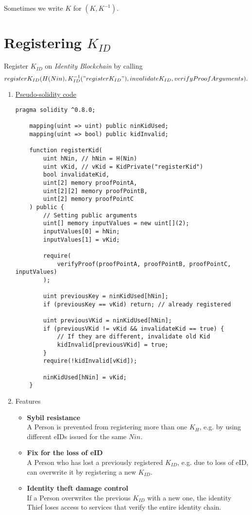 \documentclass{article}
\newcommand{\khk}{K_{H}}
\newcommand{\kid}{K_{ID}}
\newcommand{\pbc}{\textit{Identity Blockchain}}
\begin{document}
Sometimes we write $K$ for $(K, K^{-1})$.

\newpage
\section{Registering $\kid$}
Register $\kid$ on \pbc{} by calling $$register\kid(H(Nin), \kid^{-1}("register\kid"), invalidate\kid, verifyProofArguments).$$
\begin{enumerate}[leftmargin=0cm]

	\item[] \underline{Pseudo-solidity code}

	\hfill\begin{minipage}{\dimexpr\textwidth-20px}
	\begin{lstlisting}[language=Solidity]
	pragma solidity ^0.8.0;
		
	mapping(uint => uint) public ninKidUsed;
	mapping(uint => bool) public kidInvalid;
	
	function registerKid(
		uint hNin, // hNin = H(Nin)
		uint vKid, // vKid = KidPrivate("registerKid")
		bool invalidateKid,
		uint[2] memory proofPointA,
		uint[2][2] memory proofPointB,
		uint[2] memory proofPointC
	) public {
		// Setting public arguments
		uint[] memory inputValues = new uint[](2);
		inputValues[0] = hNin;
		inputValues[1] = vKid;
	
		require(
			verifyProof(proofPointA, proofPointB, proofPointC, inputValues)
		);
	
		uint previousKey = ninKidUsed[hNin];
		if (previousKey == vKid) return; // already registered
	
		uint previousVKid = ninKidUsed[hNin];
		if (previousVKid != vKid && invalidateKid == true) {
			// If they are different, invalidate old Kid
			kidInvalid[previousVKid] = true;
		}
		require(!kidInvalid[vKid]);
	
		ninKidUsed[hNin] = vKid;
	}
	\end{lstlisting}
	\xdef\tpd{\the\prevdepth}
	\end{minipage}

	\item[] Features
    \begin{itemize}
      \item[] \textbf{Sybil resistance} \\ A Person is prevented from registering more than one $\khk$, e.g. by using different eIDs issued for the same $Nin$.
          \vspace{5px}
      \item[] \textbf{Fix for the loss of eID} \\ A Person who has lost a previously registered $\kid$, e.g. due to loss of eID, can overwrite it by registering a new $\kid$.
          \vspace{5px}
      \item[] \textbf{Identity theft damage control} \\ If a Person overwrites the previous $\kid$ with a new one, the identity Thief loses access to services that verify the entire identity chain.
    \end{itemize}


\end{enumerate}
\end{document}
